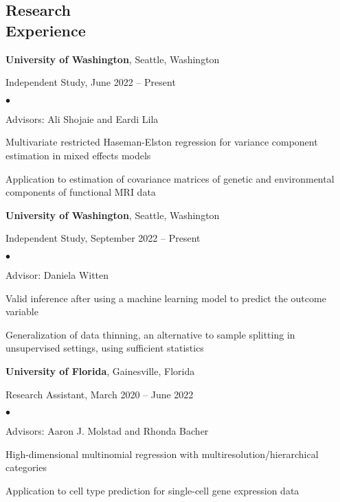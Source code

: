 \documentclass[margin,centered]{res}
\newenvironment{list1}{
  \begin{list}{\ding{113}}{%
      \setlength{\itemsep}{0in}
      \setlength{\parsep}{0in} \setlength{\parskip}{0in}
      \setlength{\topsep}{0in} \setlength{\partopsep}{0in}
      \setlength{\leftmargin}{0.17in}}}{\end{list}}
\newenvironment{list2}{
  \begin{list}{$\bullet$}{%
      \setlength{\itemsep}{0in}
      \setlength{\parsep}{0in} \setlength{\parskip}{0in}
      \setlength{\topsep}{0in} \setlength{\partopsep}{0in}
      \setlength{\leftmargin}{0.2in}}}{\end{list}}
\begin{document}
\begin{resume}
\section{\sc Research\\ Experience}
{\bf University of Washington},  Seattle, Washington
\begin{list1}
\item[] 
Independent Study, June 2022 -- Present
\begin{list2}
\item Advisors: Ali Shojaie and Eardi Lila
\item Multivariate restricted Haseman-Elston regression for variance component estimation in mixed effects models
\item Application to estimation of covariance matrices of genetic and environmental components of functional MRI data 
\end{list2} 
\end{list1}
{\bf University of Washington},  Seattle, Washington
\begin{list1}
\item[] 
Independent Study, September 2022 -- Present
\begin{list2}
\item Advisor: Daniela Witten
\item Valid inference after using a machine learning model to predict the outcome variable
\item Generalization of data thinning, an alternative to sample splitting in unsupervised settings, using sufficient statistics
\end{list2} 
\end{list1}
{\bf University of Florida},  Gainesville, Florida
\begin{list1}
\item[] 
Research Assistant, March 2020 -- June 2022
\begin{list2}
\item Advisors: Aaron J. Molstad and Rhonda Bacher
\item High-dimensional multinomial regression with multiresolution/hierarchical categories
\item Application to cell type prediction for single-cell gene expression data
\end{list2} 
\end{list1}
\vspace*{-.1in}

\end{resume}
\end{document}
